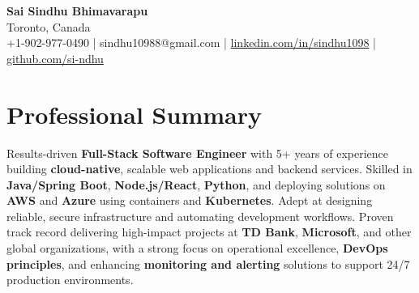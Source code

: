\documentclass[letterpaper,11pt]{article}
\begin{document}
\begin{center}
  {\Large \textbf{Sai Sindhu Bhimavarapu}} \\
  Toronto, Canada \\
  +1-902-977-0490 \enspace | \enspace sindhu10988@gmail.com \enspace | \enspace \href{https://www.linkedin.com/in/sindhu1098/}{linkedin.com/in/sindhu1098} \enspace | \enspace \href{https://github.com/si-ndhu}{github.com/si-ndhu}
\end{center}

\section{Professional Summary}
  \begin{itemize}[leftmargin=0.15in, label={}]
    \small{\item{
     Results-driven \textbf{Full-Stack Software Engineer} with 5+ years of experience building \textbf{cloud-native}, scalable web applications and backend services. Skilled in \textbf{Java/Spring Boot}, \textbf{Node.js/React}, \textbf{Python}, and deploying solutions on \textbf{AWS} and \textbf{Azure} using containers and \textbf{Kubernetes}. Adept at designing reliable, secure infrastructure and automating development workflows. Proven track record delivering high-impact projects at \textbf{TD Bank}, \textbf{Microsoft}, and other global organizations, with a strong focus on operational excellence, \textbf{DevOps principles}, and enhancing \textbf{monitoring and alerting} solutions to support 24/7 production environments.
    }}
  \end{itemize}
\vspace{-16pt}

\end{document}
